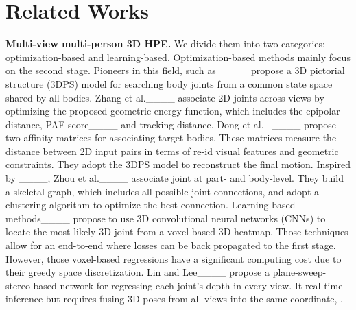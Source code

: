 \section{Related Works}

\noindent\textbf{Multi-view multi-person 3D HPE.} 
We divide them into two categories: optimization-based and learning-based. 
Optimization-based methods mainly focus on the second stage.
Pioneers in this field, such as ____ propose a 3D pictorial structure (3DPS) model for searching  body joints from a common state space shared by all bodies. 
Zhang et al.____ associate 2D joints across views by optimizing the proposed geometric energy function, which includes the epipolar distance, PAF score____ and tracking distance. 
Dong et al.~ ____ propose two affinity matrices for associating target bodies. These matrices measure the distance between 2D input pairs in terms of re-id visual features and geometric constraints. They adopt the 3DPS model to reconstruct the final motion. 
Inspired by ____, Zhou et al.____ associate joint at part- and body-level. They build a skeletal graph, which includes all possible joint connections, and adopt a clustering algorithm to optimize the best connection.
Learning-based methods____ propose to use 3D convolutional neural networks (CNNs) to locate the most likely 3D joint from a voxel-based 3D heatmap. Those techniques allow for an end-to-end  where losses can be back propagated to the first stage. However, those voxel-based regressions have a significant computing cost due to their greedy space discretization.  Lin and Lee____ propose a plane-sweep-stereo-based network for regressing each joint's depth in every view. It  real-time inference but requires fusing 3D poses from all views into the same coordinate, . 
